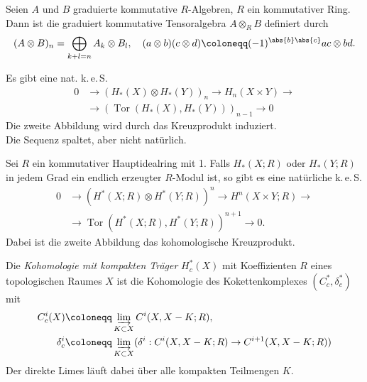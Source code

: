 \documentclass{cheat-sheet}
\DeclareMathOperator{\Tor}{Tor}
\newcommand{\keS}{k.\,e.\,S.} %
\begin{document}
\begin{defn}
  Seien $A$ und $B$ graduierte kommutative $R$-Algebren, $R$ ein kommutativer Ring. Dann ist die graduiert kommutative Tensoralgebra $A \otimes_R B$ definiert durch
  \[
    (A \otimes B)_n = \bigoplus_{k+l=n} A_k \otimes B_l, \quad
    (a \otimes b)(c \otimes d) \coloneqq (-1)^{\abs{b} \abs{c}} ac \otimes bd.
  \]
\end{defn}

\begin{satz}
  Es gibt eine nat. \keS{}
  \begin{align*}
    0 & \to (H_*(X) \otimes H_*(Y))_n \to H_n(X \times Y) \to \\
    & \to (\Tor(H_*(X), H_*(Y)))_{n-1} \to 0
  \end{align*}
  Die zweite Abbildung wird durch das Kreuzprodukt induziert. \\
  Die Sequenz spaltet, aber nicht natürlich.
\end{satz}

\begin{satz}
  Sei $R$ ein kommutativer Hauptidealring mit 1. Falls $H_*(X; R)$ oder $H_*(Y; R)$ in jedem Grad ein endlich erzeugter $R$-Modul ist, so gibt es eine natürliche \keS{}
  \begin{align*}
     0 & \to (H^*(X; R) \otimes H^*(Y; R))^n \to H^n(X \times Y; R) \to \\
     & \to \Tor(H^*(X; R), H^*(Y; R))^{n+1} \to 0.
  \end{align*}
  Dabei ist die zweite Abbildung das kohomologische Kreuzprodukt.
\end{satz}


\begin{defn}
  Die \emph{Kohomologie mit kompakten Träger} $H_c^*(X)$ mit Koeffizienten $R$ eines topologischen Raumes $X$ ist die Kohomologie des Kokettenkomplexes $(C_c^*, \delta_c^*)$ mit
  \begin{align*}
    C_c^i(X) & \coloneqq \varinjlim_{K \subset X} C^i(X, X - K; R), \\
    \delta_c^i & \coloneqq \varinjlim_{K \subset X} (\delta^i : C^i(X, X - K; R) \to C^{i+1}(X, X - K; R))
  \end{align*}
  Der direkte Limes läuft dabei über alle kompakten Teilmengen $K$.
\end{defn}
\end{document}
